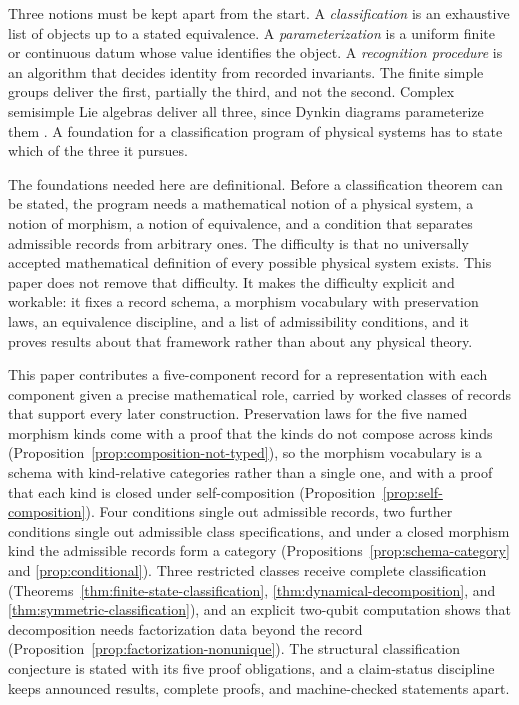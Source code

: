 \documentclass[11pt,letterpaper]{article}
\theoremstyle{definition}
\theoremstyle{remark}
\begin{document}
Three notions must be kept apart from the start. A \emph{classification} is an exhaustive list of objects up to a stated equivalence. A \emph{parameterization} is a uniform finite or continuous datum whose value identifies the object. A \emph{recognition procedure} is an algorithm that decides identity from recorded invariants. The finite simple groups deliver the first, partially the third, and not the second. Complex semisimple Lie algebras deliver all three, since Dynkin diagrams parameterize them \cite{humphreys1972}. A foundation for a classification program of physical systems has to state which of the three it pursues.

The foundations needed here are definitional. Before a classification theorem can be stated, the program needs a mathematical notion of a physical system, a notion of morphism, a notion of equivalence, and a condition that separates admissible records from arbitrary ones. The difficulty is that no universally accepted mathematical definition of every possible physical system exists. This paper does not remove that difficulty. It makes the difficulty explicit and workable: it fixes a record schema, a morphism vocabulary with preservation laws, an equivalence discipline, and a list of admissibility conditions, and it proves results about that framework rather than about any physical theory.

This paper contributes a five-component record for a representation with each component given a precise mathematical role, carried by worked classes of records that support every later construction. Preservation laws for the five named morphism kinds come with a proof that the kinds do not compose across kinds (Proposition~\ref{prop:composition-not-typed}), so the morphism vocabulary is a schema with kind-relative categories rather than a single one, and with a proof that each kind is closed under self-composition (Proposition~\ref{prop:self-composition}). Four conditions single out admissible records, two further conditions single out admissible class specifications, and under a closed morphism kind the admissible records form a category (Propositions~\ref{prop:schema-category} and \ref{prop:conditional}). Three restricted classes receive complete classification (Theorems~\ref{thm:finite-state-classification}, \ref{thm:dynamical-decomposition}, and \ref{thm:symmetric-classification}), and an explicit two-qubit computation shows that decomposition needs factorization data beyond the record (Proposition~\ref{prop:factorization-nonunique}). The structural classification conjecture is stated with its five proof obligations, and a claim-status discipline keeps announced results, complete proofs, and machine-checked statements apart.
\end{document}
